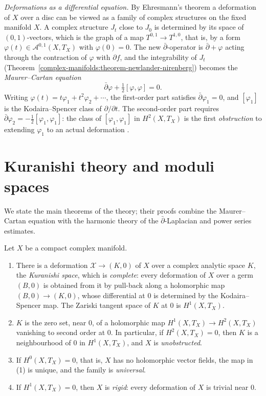 \begin{remark}\label{deformations:remark-maurer-cartan}
\emph{Deformations as a differential equation.} By Ehresmann's theorem a deformation of $X$ over a disc can be viewed as a family of complex structures on the fixed manifold $X$. A complex structure $J_t$
close to $J_0$ is determined by its space of $(0,1)$-vectors, which is the graph of a map $T^{0,1} \to T^{1,0}$, that is, by a form $\varphi(t) \in \mathcal{A}^{0,1}(X, T_X)$ with $\varphi(0) = 0$. The new
$\bar\partial$-operator is $\bar\partial + \varphi$ acting through the contraction of $\varphi$ with $\partial f$, and the integrability of $J_t$ (Theorem~\ref{complex-manifolds:theorem-newlander-nirenberg}) becomes
the \emph{Maurer--Cartan equation}
\[
\bar\partial\varphi + \tfrac12[\varphi, \varphi] = 0 .
\]
Writing $\varphi(t) = t\varphi_1 + t^2\varphi_2 + \cdots$, the first-order part satisfies $\bar\partial\varphi_1 = 0$, and $[\varphi_1]$ is the Kodaira--Spencer class of $\partial/\partial t$. The second-order part requires
$\bar\partial\varphi_2 = -\frac12[\varphi_1, \varphi_1]$: the class of $[\varphi_1, \varphi_1]$ in $H^2(X, T_X)$ is the first \emph{obstruction} to extending $\varphi_1$ to an actual deformation
\cite[Chapter 6]{huybrechts-complex}.
\end{remark}

\section{Kuranishi theory and moduli spaces}\label{deformations:section-kuranishi}

We state the main theorems of the theory; their proofs combine the Maurer--Cartan equation with the harmonic theory of the $\bar\partial$-Laplacian and power series estimates.

\begin{theorem}\label{deformations:theorem-kuranishi}
Let $X$ be a compact complex manifold.
\begin{enumerate}
\item There is a deformation $\mathcal{X} \to (K, 0)$ of $X$ over a complex analytic space $K$, the \emph{Kuranishi space}, which is \emph{complete}: every deformation of $X$ over a germ $(B, 0)$ is obtained from it by
pull-back along a holomorphic map $(B, 0) \to (K, 0)$, whose differential at $0$ is determined by the Kodaira--Spencer map. The Zariski tangent space of $K$ at $0$ is $H^1(X, T_X)$.
\item $K$ is the zero set, near $0$, of a holomorphic map $H^1(X, T_X) \to H^2(X, T_X)$ vanishing to second order at $0$. In particular, if $H^2(X, T_X) = 0$, then $K$ is a neighbourhood of $0$ in
$H^1(X, T_X)$, and $X$ is \emph{unobstructed}.
\item If $H^0(X, T_X) = 0$, that is, $X$ has no holomorphic vector fields, the map in (1) is unique, and the family is \emph{universal}.
\item If $H^1(X, T_X) = 0$, then $X$ is \emph{rigid}: every deformation of $X$ is trivial near $0$.
\end{enumerate}
\end{theorem}

